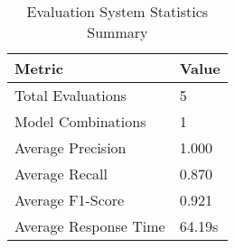\begin{table}
\caption{Evaluation System Statistics Summary}
\label{tab:system_stats}
\begin{tabular}{ll}
\toprule
Metric & Value \\
\midrule
Total Evaluations & 5 \\
Model Combinations & 1 \\
Average Precision & 1.000 \\
Average Recall & 0.870 \\
Average F1-Score & 0.921 \\
Average Response Time & 64.19s \\
\bottomrule
\end{tabular}
\end{table}
